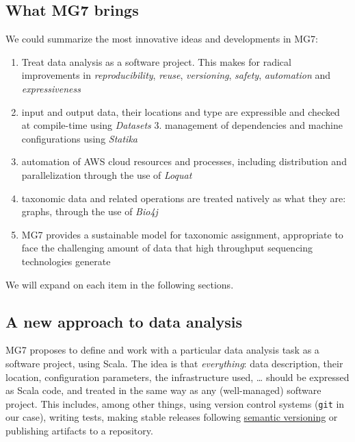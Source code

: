 \documentclass{frontiersSCNS} %
\providecommand{\tightlist}{%
\setlength{\itemsep}{0pt}\setlength{\parskip}{0pt}}
\begin{document}
\subsection{What MG7 brings}\label{what-mg7-brings}

We could summarize the most innovative ideas and developments in MG7:

\begin{enumerate}
\def\labelenumi{\arabic{enumi}.}
\tightlist
\item
  Treat data analysis as a software project. This makes for radical
  improvements in \emph{reproducibility}, \emph{reuse},
  \emph{versioning}, \emph{safety}, \emph{automation} and
  \emph{expressiveness}
\item
  input and output data, their locations and type are expressible and
  checked at compile-time using \emph{Datasets} ­3. management of
  dependencies and machine configurations using \emph{Statika}
\item
  automation of AWS cloud resources and processes, including
  distribution and parallelization through the use of \emph{Loquat}
\item
  taxonomic data and related operations are treated natively as what
  they are: graphs, through the use of \emph{Bio4j}
\item
  MG7 provides a sustainable model for taxonomic assignment, appropriate
  to face the challenging amount of data that high throughput sequencing
  technologies generate
\end{enumerate}

We will expand on each item in the following sections.

\subsection{A new approach to data
analysis}\label{a-new-approach-to-data-analysis}

MG7 proposes to define and work with a particular data analysis task as
a software project, using Scala. The idea is that \emph{everything}:
data description, their location, configuration parameters, the
infrastructure used, \ldots{} should be expressed as Scala code, and
treated in the same way as any (well-managed) software project. This
includes, among other things, using version control systems
(\texttt{git} in our case), writing tests, making stable releases
following \href{http://semver.org/}{semantic versioning} or publishing
artifacts to a repository.
\end{document}
